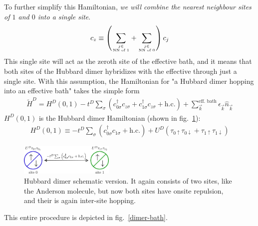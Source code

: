 \documentclass{article}
\numberwithin{equation}{section}
\begin{document}
To further simplify this Hamiltonian, \textit{we will combine the nearest neighbour sites of \(1\) and \(0\) into a single site}.
\begin{equation}\begin{aligned}
	c_z \equiv \left(\sum_{j \in \atop{\text{NN of 1}}} + \sum_{j \in \atop{\text{NN of 0}}}\right)c_{j}
\end{aligned}\end{equation}
This single site will act as the zeroth site of the effective bath, and it means that both sites of the Hubbard dimer hybridizes with the effective through just a single site. With this assumption, the Hamiltonian for "a Hubbard dimer hopping into an effective bath" takes the simple form
\begin{equation}\begin{aligned}
	\label{dimer_p_bat}
	\tilde H^D = H^D(0,1) - t^D \sum_{\sigma}\left(c^\dagger_{0\sigma}c_{z\sigma} + c^\dagger_{1\sigma}c_{z\sigma} + \text{h.c.}\right) + \sum_{\vec k}^\text{eff. bath}\epsilon_{\vec k}\hat n_{\vec k}
\end{aligned}\end{equation}
\(H^D(0,1)\) is the Hubbard dimer Hamiltonian (shown in fig.~\ref{hubb-dim}):
\begin{equation}\begin{aligned}
	\label{dimer_ham}
	H^D(0,1) \equiv -t^D\sum_\sigma\left( c^\dagger_{0\sigma}c_{1\sigma} + \text{h.c.} \right) + U^D\left( \tau_{0 \uparrow}\tau_{0 \downarrow} + \tau_{1 \uparrow}\tau_{1 \downarrow}\right)
\end{aligned}\end{equation}
\begin{figure}[htpb!]
	\centering
	\includegraphics[width=0.4\textwidth]{hubb_dim.png}
	\caption{Hubbard dimer schematic version. It again consists of two sites, like the Anderson molecule, but now both sites have onsite repulsion, and their is again inter-site hopping.}
	\label{hubb-dim}
\end{figure}
This entire procedure is depicted in fig.~\ref{dimer-bath}.
\end{document}
